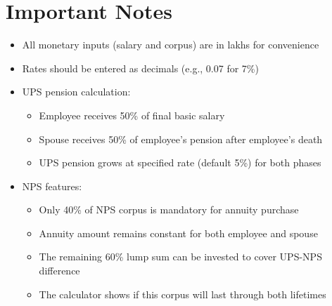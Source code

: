 \documentclass{article}
\begin{document}
\section{Important Notes}
\begin{itemize}
    \item All monetary inputs (salary and corpus) are in lakhs for convenience
    \item Rates should be entered as decimals (e.g., 0.07 for 7\%)
    \item UPS pension calculation:
    \begin{itemize}
        \item Employee receives 50\% of final basic salary
        \item Spouse receives 50\% of employee's pension after employee's death
        \item UPS pension grows at specified rate (default 5\%) for both phases
    \end{itemize}
    \item NPS features:
    \begin{itemize}
        \item Only 40\% of NPS corpus is mandatory for annuity purchase
        \item Annuity amount remains constant for both employee and spouse
        \item The remaining 60\% lump sum can be invested to cover UPS-NPS difference
        \item The calculator shows if this corpus will last through both lifetimes
    \end{itemize}
\end{itemize}
\end{document}
